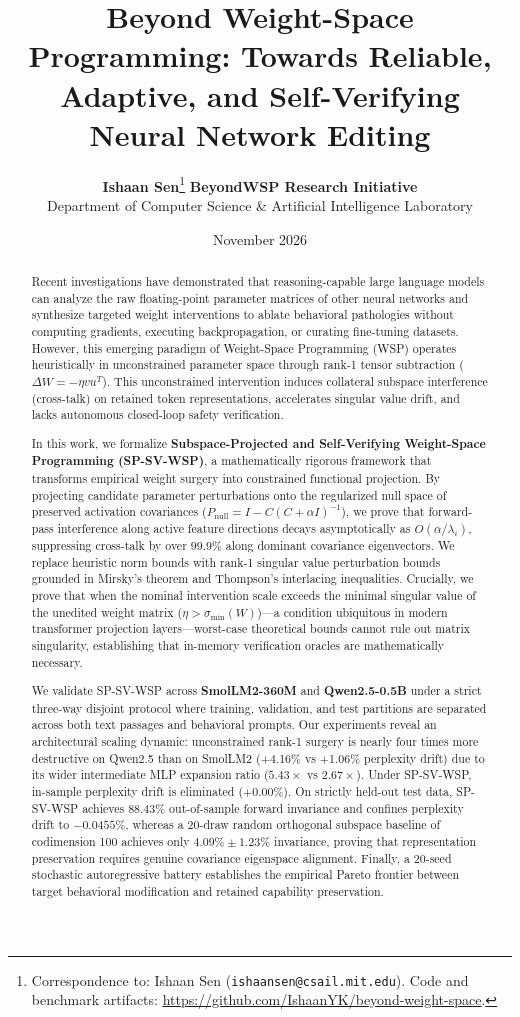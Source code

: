 \documentclass[11pt,a4paper]{article}
\title{\textbf{Beyond Weight-Space Programming: Towards Reliable, Adaptive, and Self-Verifying Neural Network Editing}}
\author{
  \textbf{Ishaan Sen}\thanks{Correspondence to: Ishaan Sen (\texttt{ishaansen@csail.mit.edu}). Code and benchmark artifacts: \url{https://github.com/IshaanYK/beyond-weight-space}.} \quad \textbf{BeyondWSP Research Initiative} \\
  Department of Computer Science \& Artificial Intelligence Laboratory
}
\date{November 2026}
\begin{document}
\maketitle

\begin{abstract}
Recent investigations have demonstrated that reasoning-capable large language models can analyze the raw floating-point parameter matrices of other neural networks and synthesize targeted weight interventions to ablate behavioral pathologies without computing gradients, executing backpropagation, or curating fine-tuning datasets. However, this emerging paradigm of Weight-Space Programming (WSP) operates heuristically in unconstrained parameter space through rank-1 tensor subtraction ($\Delta W = -\eta v u^T$). This unconstrained intervention induces collateral subspace interference (cross-talk) on retained token representations, accelerates singular value drift, and lacks autonomous closed-loop safety verification. 

In this work, we formalize \textbf{Subspace-Projected and Self-Verifying Weight-Space Programming (SP-SV-WSP)}, a mathematically rigorous framework that transforms empirical weight surgery into constrained functional projection. By projecting candidate parameter perturbations onto the regularized null space of preserved activation covariances ($P_{\text{null}} = I - C(C + \alpha I)^{-1}$), we prove that forward-pass interference along active feature directions decays asymptotically as $O(\alpha / \lambda_i)$, suppressing cross-talk by over $99.9\%$ along dominant covariance eigenvectors. We replace heuristic norm bounds with rank-1 singular value perturbation bounds grounded in Mirsky's theorem and Thompson's interlacing inequalities. Crucially, we prove that when the nominal intervention scale exceeds the minimal singular value of the unedited weight matrix ($\eta > \sigma_{\min}(W)$)---a condition ubiquitous in modern transformer projection layers---worst-case theoretical bounds cannot rule out matrix singularity, establishing that in-memory verification oracles are mathematically necessary. 

We validate SP-SV-WSP across \textbf{SmolLM2-360M} and \textbf{Qwen2.5-0.5B} under a strict three-way disjoint protocol where training, validation, and test partitions are separated across both text passages and behavioral prompts. Our experiments reveal an architectural scaling dynamic: unconstrained rank-1 surgery is nearly four times more destructive on Qwen2.5 than on SmolLM2 (+4.16\% vs +1.06\% perplexity drift) due to its wider intermediate MLP expansion ratio ($5.43\times$ vs $2.67\times$). Under SP-SV-WSP, in-sample perplexity drift is eliminated (+0.00\%). On strictly held-out test data, SP-SV-WSP achieves $88.43\%$ out-of-sample forward invariance and confines perplexity drift to $-0.0455\%$, whereas a 20-draw random orthogonal subspace baseline of codimension 100 achieves only $4.09\% \pm 1.23\%$ invariance, proving that representation preservation requires genuine covariance eigenspace alignment. Finally, a 20-seed stochastic autoregressive battery establishes the empirical Pareto frontier between target behavioral modification and retained capability preservation.
\end{abstract}
\end{document}
